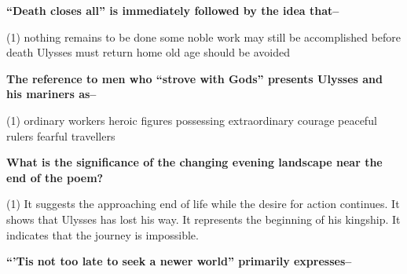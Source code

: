 \documentclass[12pt,a4paper]{exam}
\begin{document}
\begin{questions}

	\begin{minipage}{\textwidth}
		\question \textbf{``Death closes all'' is immediately followed by the idea that--}

		\begin{tasks}(1)
			\task nothing remains to be done
			\task some noble work may still be accomplished before death
			\task Ulysses must return home
			\task old age should be avoided
		\end{tasks}
	\end{minipage}


	\begin{minipage}{\textwidth}
		\question \textbf{The reference to men who ``strove with Gods'' presents Ulysses and his mariners as--}

		\begin{tasks}(1)
			\task ordinary workers
			\task heroic figures possessing extraordinary courage
			\task peaceful rulers
			\task fearful travellers
		\end{tasks}
	\end{minipage}


	\begin{minipage}{\textwidth}
		\question \textbf{What is the significance of the changing evening landscape near the end of the poem?}

		\begin{tasks}(1)
			\task It suggests the approaching end of life while the desire for action continues.
			\task It shows that Ulysses has lost his way.
			\task It represents the beginning of his kingship.
			\task It indicates that the journey is impossible.
		\end{tasks}
	\end{minipage}


	\begin{minipage}{\textwidth}
		\question \textbf{``'Tis not too late to seek a newer world'' primarily expresses--}


\end{minipage}
\end{questions}
\end{document}

